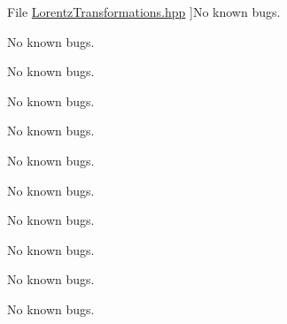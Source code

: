 \begin{DoxyRefList}
%
File \hyperlink{_lorentz_transformations_8hpp}{Lorentz\+Transformations.hpp} ]No known bugs.  
\item[\label{bug__bug000034}%
\Hypertarget{bug__bug000034}%
File \hyperlink{_lorentz_transformations_8inl}{Lorentz\+Transformations.inl} ]No known bugs.  
\item[\label{bug__bug000011}%
\Hypertarget{bug__bug000011}%
File \hyperlink{_luminosity_8hpp}{Luminosity.hpp} ]No known bugs.  
\item[\label{bug__bug000012}%
\Hypertarget{bug__bug000012}%
File \hyperlink{_luminosity_8inl}{Luminosity.inl} ]No known bugs.  
\item[\label{bug__bug000025}%
\Hypertarget{bug__bug000025}%
File \hyperlink{_optics_8hpp}{Optics.hpp} ]No known bugs.  
\item[\label{bug__bug000026}%
\Hypertarget{bug__bug000026}%
File \hyperlink{_optics_constants_8hpp}{Optics\+Constants.hpp} ]No known bugs.  
\item[\label{bug__bug000013}%
\Hypertarget{bug__bug000013}%
File \hyperlink{_orbital_charecteristics_8hpp}{Orbital\+Charecteristics.hpp} ]No known bugs.  
\item[\label{bug__bug000014}%
\Hypertarget{bug__bug000014}%
File \hyperlink{_orbital_charecteristics_8inl}{Orbital\+Charecteristics.inl} ]No known bugs.  
\item[\label{bug__bug000009}%
\Hypertarget{bug__bug000009}%
File \hyperlink{_periapsis_8hpp}{Periapsis.hpp} ]No known bugs. 

No known bugs.  
\item[\label{bug__bug000010}%
\Hypertarget{bug__bug000010}%
File \hyperlink{_periapsis_8inl}{Periapsis.inl} ]No known bugs. 


\end{DoxyRefList}
